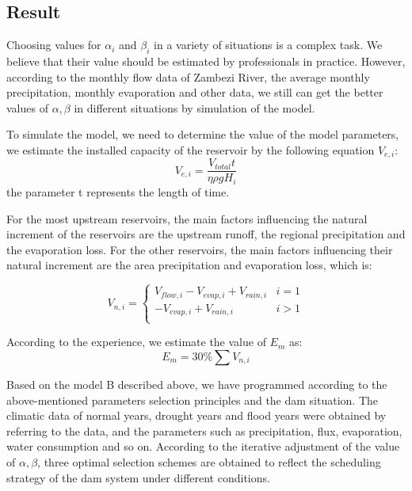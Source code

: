 \documentclass{mcmthesis}
\begin{document}
\subsection{Result}
Choosing values for $ \alpha_ {i} $ and $ \beta_ {i} $ in a variety of situations is a complex task. We believe that their value should be estimated by professionals in practice. However, according to the monthly flow data of Zambezi River, the average monthly precipitation, monthly evaporation and other data, we still can get the better values of $ \alpha, \beta $ in different situations by simulation of the model. 

To simulate the model, we need to determine the value of the model parameters, we estimate the installed capacity of the reservoir by the following equation $V_{e, i}$:
\begin{equation}
V_{e, i} = \frac{V_{total}t}{\eta \rho gH_{i}}
\end{equation}
the parameter t represents the length of time.

For the most upstream reservoirs, the main factors influencing the natural increment of the reservoirs are the upstream runoff, the regional precipitation and the evaporation loss. For the other reservoirs, the main factors influencing their natural increment are the area precipitation and evaporation loss, which is:

\begin{equation}
V_{n,i} = \left\{
\begin{array}{cc}
V_{flow,i} - V_{evap,i} + V_{rain,i} & i = 1 \\
-V_{evap,i} + V_{rain,i} & i > 1 \\
\end{array}
\right.
\end{equation}

According to the experience, we estimate the value of $E_{m}$ as:
\begin{equation}
E_{m} = 30\%\sum V_{n, i}
\end{equation}

Based on the model B described above, we have programmed according to the above-mentioned parameters selection principles and the dam situation. The climatic data of normal years, drought years and flood years were obtained by referring to the data, and the parameters such as precipitation, flux, evaporation, water consumption and so on. According to the iterative adjustment of the value of $ \alpha, \beta $, three optimal selection schemes are obtained to reflect the scheduling strategy of the dam system under different conditions.
\end{document}
